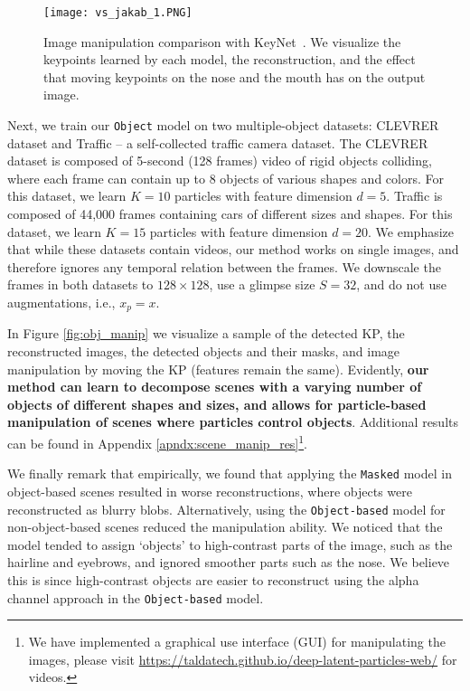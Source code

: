 \documentclass[nohyperref]{article}
\theoremstyle{plain}
\theoremstyle{definition}
\theoremstyle{remark}
\begin{document}
\begin{figure*}
     \centering
     \texttt{[image: vs\_jakab\_1.PNG]}
     \vspace{-2em}
        \caption{Image manipulation comparison with KeyNet~\citep{jakab2018unsupervised}. We visualize the keypoints learned by each model, the reconstruction, and the effect that moving keypoints on the nose and the mouth has on the output image.}
        \label{fig:vs_jakab_1}
\end{figure*}

Next, we train our \texttt{Object} model on two multiple-object datasets: CLEVRER~\citep{yi2019clevrer} dataset and Traffic -- a self-collected traffic camera dataset. The CLEVRER dataset is composed of 5-second (128 frames) video of rigid objects colliding, where each frame can contain up to 8 objects of various shapes and colors. For this dataset, we learn $K=10$ particles with feature dimension $d=5$. Traffic is composed of 44,000 frames containing cars of different sizes and shapes. For this dataset, we learn $K=15$ particles with feature dimension $d=20$.
We emphasize that while these datasets contain videos, our method works on single images, and therefore ignores any temporal relation between the frames. We downscale the frames in both datasets to $128 \times 128$, use a glimpse size $S=32$, and do not use augmentations, i.e., $x_p=x$.


In Figure \ref{fig:obj_manip} we visualize a sample of the detected KP, the reconstructed images, the detected objects and their masks, and image manipulation by moving the KP (features remain the same).
Evidently, \textbf{our method can learn to decompose scenes with a varying number of objects of different shapes and sizes, and allows for particle-based manipulation of scenes where particles control objects}. 
Additional results can be found in Appendix \ref{apndx:scene_manip_res}\footnote{We have implemented a graphical use interface (GUI) for manipulating the images, please visit \url{https://taldatech.github.io/deep-latent-particles-web/} for videos. }.

We finally remark that empirically, we found that applying the \texttt{Masked} model in object-based scenes resulted in worse reconstructions, where objects were reconstructed as blurry blobs. 
Alternatively, using the \texttt{Object-based}  model
for non-object-based scenes reduced the manipulation ability. We noticed
that the model tended to assign `objects' to high-contrast parts of the image, such as the hairline and eyebrows, and ignored smoother parts such as the nose. We believe this is since high-contrast objects are easier to reconstruct using the alpha channel approach in the \texttt{Object-based}  model.
\end{document}
